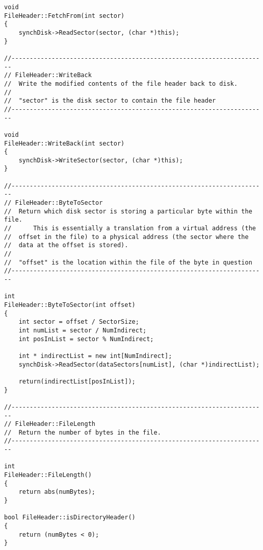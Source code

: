 \documentclass[a4paper,10pt]{article}
\begin{document}
\begin{lstlisting}
void
FileHeader::FetchFrom(int sector)
{
    synchDisk->ReadSector(sector, (char *)this);
}

//----------------------------------------------------------------------
// FileHeader::WriteBack
// 	Write the modified contents of the file header back to disk.
//
//	"sector" is the disk sector to contain the file header
//----------------------------------------------------------------------

void
FileHeader::WriteBack(int sector)
{
    synchDisk->WriteSector(sector, (char *)this);
}

//----------------------------------------------------------------------
// FileHeader::ByteToSector
// 	Return which disk sector is storing a particular byte within the file.
//      This is essentially a translation from a virtual address (the
//	offset in the file) to a physical address (the sector where the
//	data at the offset is stored).
//
//	"offset" is the location within the file of the byte in question
//----------------------------------------------------------------------

int
FileHeader::ByteToSector(int offset)
{
    int sector = offset / SectorSize;
    int numList = sector / NumIndirect;
    int posInList = sector % NumIndirect;

    int * indirectList = new int[NumIndirect];
    synchDisk->ReadSector(dataSectors[numList], (char *)indirectList);

    return(indirectList[posInList]);
}

//----------------------------------------------------------------------
// FileHeader::FileLength
// 	Return the number of bytes in the file.
//----------------------------------------------------------------------

int
FileHeader::FileLength()
{
    return abs(numBytes);
}

bool FileHeader::isDirectoryHeader()
{
    return (numBytes < 0);
}
\end{lstlisting}
\end{document}

